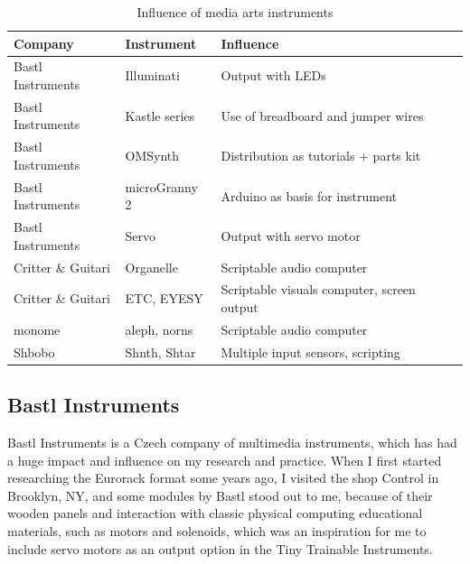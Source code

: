 \begin{table}[ht]
    \centering
    \begin{tabular}{ | l |  l | l |}
        \hline
        \textbf{Company}    & \textbf{Instrument} & \textbf{Influence}              \\
        \hline
        Bastl Instruments   & Illuminati    & Output with LEDs                      \\
        \hline
        Bastl Instruments   & Kastle series & Use of breadboard and jumper wires    \\
        \hline
        Bastl Instruments   & OMSynth       & Distribution as tutorials + parts kit \\
        \hline
        Bastl Instruments   & microGranny 2 & Arduino as basis for instrument       \\
        \hline
        Bastl Instruments   & Servo         & Output with servo motor               \\
        \hline
        Critter \& Guitari  & Organelle     & Scriptable audio computer             \\
        \hline
        Critter \& Guitari  & ETC, EYESY    & Scriptable visuals computer, screen output\\
        \hline
        monome              & aleph, norns  & Scriptable audio computer            \\
        \hline
        Shbobo              & Shnth, Shtar  & Multiple input sensors, scripting     \\
        \hline
    \end{tabular}
    \caption{Influence of media arts instruments}
    \label{table:media-arts-instruments-influence}
\end{table}{}

\subsection{Bastl Instruments}

Bastl Instruments is a Czech company of multimedia instruments, which has had a huge impact and influence on my research and practice. When I first started researching the Eurorack format some years ago, I visited the shop Control in Brooklyn, NY, and some modules by Bastl stood out to me, because of their wooden panels and interaction with classic physical computing educational materials, such as motors and solenoids, which was an inspiration for me to include servo motors as an output option in the Tiny Trainable Instruments.

